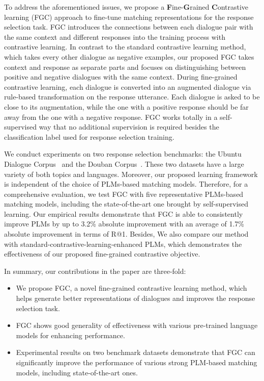 \documentclass[letterpaper]{article} \usepackage{aaai22}  \usepackage{times}  \usepackage{helvet}  \usepackage{courier}  \usepackage[hyphens]{url}  \usepackage{graphicx} \urlstyle{rm} \def\UrlFont{\rm}  \usepackage{natbib}  \usepackage{caption} \DeclareCaptionStyle{ruled}{labelfont=normalfont,labelsep=colon,strut=off} \frenchspacing  \setlength{\pdfpagewidth}{8.5in}  \setlength{\pdfpageheight}{11in}  \usepackage{algorithm}
\begin{document}
To address the aforementioned issues, we propose a \textbf{F}ine-\textbf{G}rained \textbf{C}ontrastive learning (FGC) approach to fine-tune matching representations for the response selection task. FGC introduces the connections between each dialogue pair with the same context and different responses into the training process with contrastive learning. In contrast to the standard contrastive learning method, which takes every other dialogue as negative examples, our proposed FGC takes context and response as separate parts and focuses on distinguishing between positive and negative dialogues with the same context. During fine-grained contrastive learning, each dialogue is converted into an augmented dialogue via rule-based transformation on the response utterance. Each dialogue is asked to be close to its augmentation, while the one with a positive response should be far away from the one with a negative response. FGC works totally in a self-supervised way that no additional supervision is required besides the classification label used for response selection training.

We conduct experiments on two response selection benchmarks: the Ubuntu Dialogue Corpus~\cite{lowe2015ubuntu} and the Douban Corpus~\cite{wu2016sequential}. These two datasets have a large variety of both topics and languages. Moreover, our proposed learning framework is independent of the choice of PLMs-based matching models. Therefore, for a comprehensive evaluation, we test FGC with five representative PLMs-based matching models, including the state-of-the-art one brought by self-supervised learning. Our empirical results demonstrate that FGC is able to consistently improve PLMs by up to 3.2\% absolute improvement with an average of 1.7\% absolute improvement in terms of R@1. Besides, We also compare our method with standard-contrastive-learning-enhanced PLMs, which demonstrates the effectiveness of our proposed fine-grained contrastive objective. 


In summary, our contributions in the paper are three-fold:
\begin{itemize}
    \item We propose FGC, a novel fine-grained contrastive learning method, which helps generate better representations of dialogues and improves the response selection task.
    \item FGC shows good generality of effectiveness with various pre-trained language models for enhancing performance.
    \item Experimental results on two benchmark datasets demonstrate that FGC can significantly improve the performance of various strong PLM-based matching models, including state-of-the-art ones.
\end{itemize}
\end{document}
